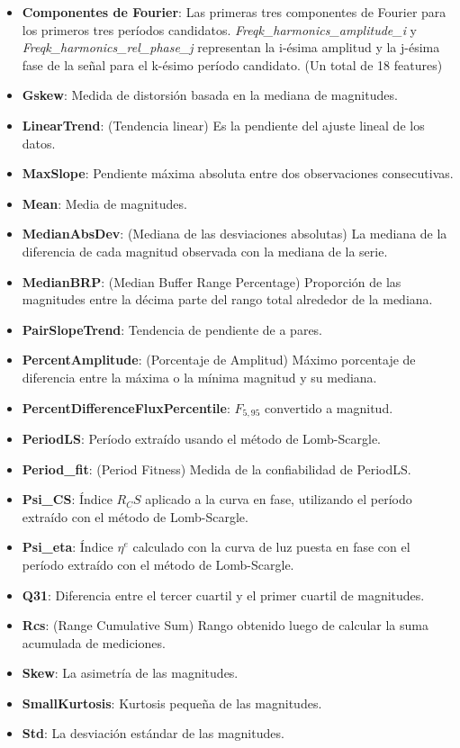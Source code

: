 \begin{appendix}
\begin{itemize}
\item \textbf{Componentes de Fourier}: Las primeras tres componentes de Fourier para los primeros tres períodos candidatos. \textit{Freqk\_harmonics\_amplitude\_i} y \textit{Freqk\_harmonics\_rel\_phase\_j} representan la i-ésima amplitud y la j-ésima fase de la señal para el k-ésimo período candidato. (Un total de 18 features)

\item \textbf{Gskew}: Medida de distorsión basada en la mediana de magnitudes.

\item \textbf{LinearTrend}: (Tendencia linear) Es la pendiente del ajuste lineal de los datos.

\item \textbf{MaxSlope}: Pendiente máxima absoluta entre dos observaciones consecutivas.

\item \textbf{Mean}: Media de magnitudes.
\item \textbf{MedianAbsDev}: (Mediana de las desviaciones absolutas) La mediana de la diferencia de cada magnitud observada con la mediana de la serie.
\item \textbf{MedianBRP}: (Median Buffer Range Percentage) Proporción de las magnitudes entre la décima parte del rango total alrededor de la mediana.
\item \textbf{PairSlopeTrend}: Tendencia de pendiente de a pares.
\item \textbf{PercentAmplitude}: (Porcentaje de Amplitud) Máximo porcentaje de diferencia entre la máxima o la mínima magnitud y su mediana.
\item \textbf{PercentDifferenceFluxPercentile}: $F_{5,95}$ convertido a magnitud.
\item \textbf{PeriodLS}: Período extraído usando el método de Lomb-Scargle.
\item \textbf{Period\_fit}: (Period Fitness) Medida de la confiabilidad de PeriodLS.
\item \textbf{Psi\_CS}: Índice $R_CS$ aplicado a la curva en fase, utilizando el período extraído con el método de Lomb-Scargle.
\item \textbf{Psi\_eta}: Índice $\eta^e$ calculado con la curva de luz puesta en fase con el período extraído con el método de Lomb-Scargle.
\item \textbf{Q31}: Diferencia entre el tercer cuartil y el primer cuartil de magnitudes.
\item \textbf{Rcs}: (Range Cumulative Sum) Rango obtenido luego de calcular la suma acumulada de mediciones.
\item \textbf{Skew}: La asimetría de las magnitudes.
\item \textbf{SmallKurtosis}: Kurtosis pequeña de las magnitudes.
\item \textbf{Std}: La desviación estándar de las magnitudes.
\end{itemize}


\end{appendix}
